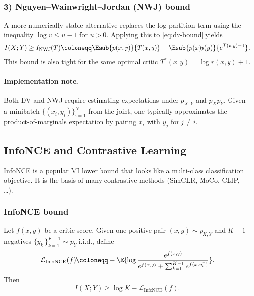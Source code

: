 \subsubsection*{3) Nguyen--Wainwright--Jordan (NWJ) bound}

A more numerically stable alternative replaces the log-partition term using the inequality
\(\log u \le u-1\) for $u>0$.
Applying this to \eqref{eq:dv-bound} yields
\begin{equation}
\label{eq:nwj-bound}
    I(X;Y)
    \ge I_{\mathrm{NWJ}}(T)
    \coloneqq \Esub{p(x,y)}{T(x,y)} - \Esub{p(x)p(y)}{e^{T(x,y)-1}}.
\end{equation}
This bound is also tight for the same optimal critic $T^*(x,y)=\log r(x,y)+1$.

\paragraph{Implementation note.}
Both DV and NWJ require estimating expectations under $p_{X,Y}$ and $p_Xp_Y$.
Given a minibatch $\{(x_i,y_i)\}_{i=1}^N$ from the joint, one typically approximates the product-of-marginals expectation by pairing $x_i$ with $y_j$ for $j\neq i$.

\subsection{InfoNCE and Contrastive Learning}
\label{sec:infonce}

InfoNCE is a popular MI lower bound that looks like a multi-class classification objective.
It is the basis of many contrastive methods (SimCLR, MoCo, CLIP, \dots).

\subsubsection*{InfoNCE bound}

Let $f(x,y)$ be a critic score.
Given one positive pair $(x,y)\sim p_{X,Y}$ and $K-1$ negatives $\{y^-_k\}_{k=1}^{K-1}\sim p_Y$ i.i.d., define
\begin{equation}
\label{eq:infonce-loss}
    \mathcal{L}_{\mathrm{InfoNCE}}(f)
    \coloneqq -\E{\log \frac{e^{f(x,y)}}{e^{f(x,y)}+\sum_{k=1}^{K-1} e^{f(x,y^-_k)}}}.
\end{equation}
Then
\begin{equation}
\label{eq:infonce-bound}
    I(X;Y) \ge \log K - \mathcal{L}_{\mathrm{InfoNCE}}(f).
\end{equation}

